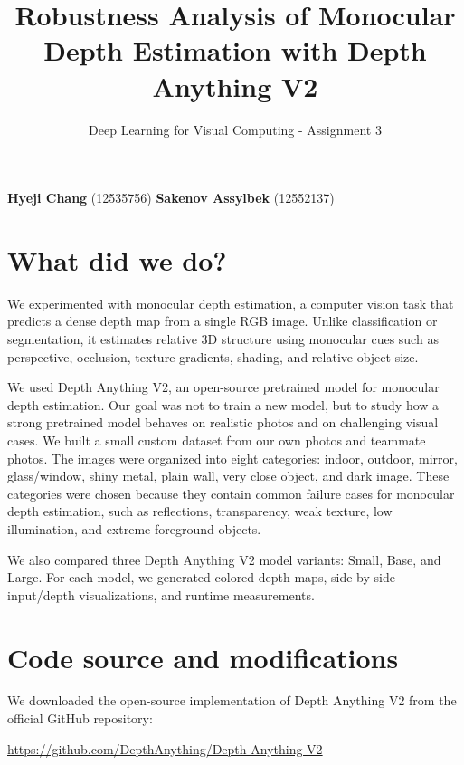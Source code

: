 \documentclass[10pt,a4paper]{article}
\title{\vspace{-1.2cm}Robustness Analysis of Monocular Depth Estimation with Depth Anything V2}
\author{Deep Learning for Visual Computing - Assignment 3}
\date{\vspace{-0.4cm}}
\begin{document}
\maketitle
\vspace{-0.95cm}
\begin{center}
\textbf{Hyeji Chang} (12535756) \quad\quad
\textbf{Sakenov Assylbek} (12552137)
\end{center}
\vspace{-0.25cm}
\fontsize{9.2}{10.6}\selectfont

\section{What did we do?}

We experimented with monocular depth estimation, a computer vision task that predicts a dense depth map from a single RGB image. Unlike classification or segmentation, it estimates relative 3D structure using monocular cues such as perspective, occlusion, texture gradients, shading, and relative object size.

We used Depth Anything V2, an open-source pretrained model for monocular depth estimation. Our goal was not to train a new model, but to study how a strong pretrained model behaves on realistic photos and on challenging visual cases. We built a small custom dataset from our own photos and teammate photos. The images were organized into eight categories: indoor, outdoor, mirror, glass/window, shiny metal, plain wall, very close object, and dark image. These categories were chosen because they contain common failure cases for monocular depth estimation, such as reflections, transparency, weak texture, low illumination, and extreme foreground objects.

We also compared three Depth Anything V2 model variants: Small, Base, and Large. For each model, we generated colored depth maps, side-by-side input/depth visualizations, and runtime measurements.

\section{Code source and modifications}

We downloaded the open-source implementation of Depth Anything V2 from the official GitHub repository:

\begin{center}
\url{https://github.com/DepthAnything/Depth-Anything-V2}
\end{center}
\end{document}
